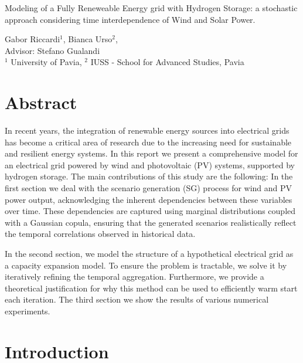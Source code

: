 \documentclass[english]{article}
\numberwithin{definition}{section}
\numberwithin{theorem}{section}
\numberwithin{problem}{section}
\begin{document}
\begin{center}
    

\LARGE{Modeling of a Fully Reneweable Energy grid with Hydrogen Storage: a stochastic approach considering time interdependence of Wind and Solar Power.} 
\end{center}
Gabor Riccardi$^1$, Bianca Urso$^2$, \\
Advisor: Stefano Gualandi \\
$^1$ University of Pavia, $^2$ IUSS - School for Advanced Studies, Pavia\\




\section*{Abstract}
    
In recent years, the integration of renewable energy sources into electrical grids has become a critical area of 
research due to the increasing need for sustainable and resilient energy systems. In this report we present a
 comprehensive model for an electrical grid powered by wind and photovoltaic (PV) systems, supported by hydrogen storage. 
The main contributions of this study are the following:
In the first section we deal with the scenario generation (SG) process for wind and PV power output,
 acknowledging the inherent dependencies between these variables over time.
  These dependencies are captured using marginal distributions coupled with a Gaussian copula, ensuring that the generated scenarios realistically reflect the temporal correlations observed in historical data. 

In the second section, we model the structure of a hypothetical electrical grid as a capacity expansion model. To ensure the problem is tractable, we solve it by iteratively refining the temporal aggregation. Furthermore, we provide a theoretical justification for why this method can be used to efficiently warm start each iteration.
The third section we show the results of various numerical experiments.

\section*{Introduction}
\end{document}
